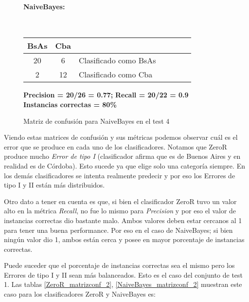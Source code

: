 \begin{figure}[H]
\centering
\paragraph*{NaiveBayes:}\mbox{}\\
\begin{table}[H]
\centering
\begin{tabular}{|c|c|l|c|c|c|c|}
\hline
 BsAs & Cba &  \\ \hline
 20 &  6 &  Clasificado como BsAs \\ \hline
 2  &  12 &  Clasificado como Cba \\ \hline
\end{tabular}
\end{table}
\begin{center}
\textbf{Precision = 20/26 = 0.77;} \textbf{Recall = 20/22 = 0.9}\\
\textbf{Instancias correctas = 80\%}
\end{center}
\caption{Matriz de confusión para NaiveBayes en el test 4}
\label{NaiveBayes_matrizconf}
\end{figure}

Viendo estas matrices de confusión y sus métricas podemos observar cuál es el error que se produce en cada uno de los clasificadores. Notamos que ZeroR produce mucho \textit{Error de tipo I} (clasificador afirma que es de Buenos Aires y en realidad es de Córdoba). Esto sucede ya que elige solo una categoría siempre. En los demás clasificadores se intenta realmente predecir y por eso los Errores de tipo I y II están más distribuidos.

Otro dato a tener en cuenta es que, si bien el clasificador ZeroR tuvo un valor alto en la métrica \textit{Recall}, no fue lo mismo para \textit{Precision} y por eso el valor de instancias correctas dio bastante malo. Ambos valores deben estar cercanos al 1 para tener una buena performance. Por eso en el caso de NaiveBayes; si bien ningún valor dio 1, ambos están cerca y posee en mayor porcentaje de instancias correctas.

Puede suceder que el porcentaje de instancias correctas sea el mismo pero los Errores de tipo I y II sean más balanceados. Esto es el caso del conjunto de test 1. Las tablas \ref{ZeroR_matrizconf_2}, \ref{NaiveBayes_matrizconf_2} muestran este caso para los clasificadores ZeroR y NaiveBayes es:


